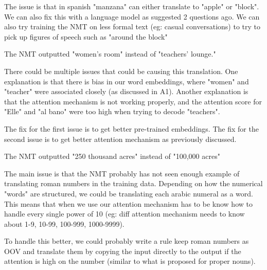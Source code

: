 \documentclass[11pt,largemargins]{homework}
\begin{document}
The issue is that in spanish "manzana" can either translate to "apple" or "block". We can also fix this with a language model as suggested 2 questions ago. We can also try training the NMT on less formal text (eg: casual conversations) to try to pick up figures of speech such as "around the block"

\question

The NMT outputted "women’s room" instead of "teachers’ lounge."

There could be multiple issues that could be causing this translation. One explanation is that there is bias in our word embeddings, where "women" and "teacher" were associated closely (as discussed in A1). Another explanation is that the attention mechanism is not working properly, and the attention score for "Elle" and "al  bano" were too high when trying to decode "teachers". 

The fix for the first issue is to get better pre-trained embeddings. The fix for the second issue is to get better attention mechanism as previously discussed. 


\question
The NMT outputted "250 thousand acres" instead of "100,000 acres"

The main issue is that the NMT probably has not seen enough example of translating roman numbers in the training data. Depending on how the numerical "words" are structured, we could be translating each arabic numeral as a word. This means that when we use our attention mechanism has to be know how to handle every single power of 10 (eg: diff attention mechanism needs to know about 1-9, 10-99, 100-999, 1000-9999). 

To handle this better, we could probably write a rule keep roman numbers as OOV and translate them by copying the input directly to the output if the attention is high on the number (similar to what is proposed for proper nouns). 
\end{document}
